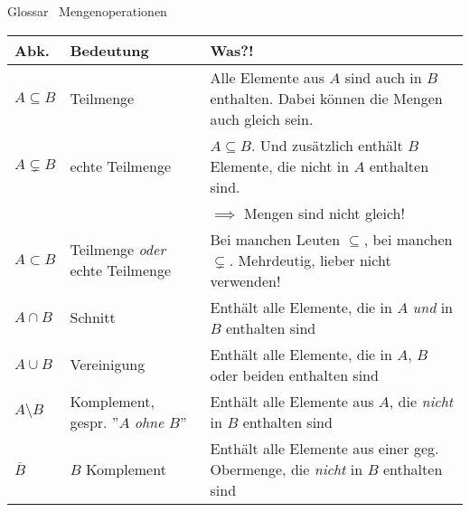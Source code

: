 \begin{frame}[fragile]{Glossar \textemdash\ Mengenoperationen}
    \small
    \begin{tabular}{p{} p{} p{}}
        \toprule
        Abk.             & Bedeutung                                    & Was?!                                                                                         \\
        \midrule
        $A \subseteq B$  & Teilmenge                                    & Alle Elemente aus $A$ sind auch in $B$ enthalten. Dabei können die Mengen auch gleich sein.   \\
        $A \subsetneq B$ & echte Teilmenge                              & $A\subseteq B$. Und zusätzlich enthält $B$ Elemente, die nicht in $A$ enthalten sind.         \\
                         &                                              & $\implies$ Mengen sind nicht gleich!                                                          \\
        $A \subset B$    & Teilmenge \emph{oder} echte Teilmenge        & Bei manchen Leuten $\subseteq$, bei manchen $\subsetneq$. Mehrdeutig, lieber nicht verwenden! \\
        $A\cap B$        & Schnitt                                      & Enthält alle Elemente, die in $A$ \textit{und} in $B$ enthalten sind                          \\
        $A\cup B$        & Vereinigung                                  & Enthält alle Elemente, die in $A$, $B$ oder beiden enthalten sind                             \\
        $A\setminus B$   & Komplement, gespr. ''$A$ \textit{ohne} $B$'' & Enthält alle Elemente aus $A$, die \textit{nicht} in $B$ enthalten sind                       \\
        $\overline{B}$   & $B$ Komplement                               & Enthält alle Elemente aus einer geg. Obermenge, die \textit{nicht} in $B$ enthalten sind      \\
        \bottomrule
    \end{tabular}
\end{frame}